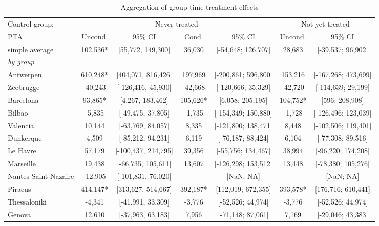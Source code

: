 \begin{table}[ht]
\centering
\caption{Aggregation of group time treatment effects} 
\begingroup\begin{adjustbox}{max width=\textwidth}
\begin{tabular}{lcccccc}
  \hline
\hline
Control group: & \multicolumn{4}{c}{Never treated} & \multicolumn{2}{c}{Not yet treated} \\
 \cmidrule(lr){2-5} \cmidrule(lr){6-7}  PTA & Uncond. & 95\% CI & Cond. & 95\% CI & Uncond. & 95\% CI  \\ 
  \hline
simple average & 102,536* & [55,772, 149,300] &   36,030 & [-54,648; 126,707] &   28,683 & [-39,537; 96,902] \\ 
   [1ex]\emph{by group} &  &  &  &  &  &  \\ 
   \hline
Antwerpen & 610,248* & [404,071, 816,426] &  197,969 & [-200,861; 596,800] &  153,216 & [-167,268; 473,699] \\ 
  Zeebrugge & -40,243 & [-126,416, 45,930] &  -42,668 & [-120,666; 35,329] &  -42,720 & [-114,639; 29,199] \\ 
  Barcelona &  93,865* & [4,267, 183,462] &  105,626* & [6,058; 205,195] &  104,752* & [596; 208,908] \\ 
  Bilbao &  -5,835 & [-49,475, 37,805] &   -1,735 & [-154,349; 150,880] &   -1,728 & [-126,496; 123,039] \\ 
  Valencia &  10,144 & [-63,769, 84,057] &    8,335 & [-121,800; 138,471] &    8,448 & [-102,506; 119,401] \\ 
  Dunkerque &   4,509 & [-85,212, 94,231] &    6,119 & [-76,187; 88,424] &    6,104 & [-77,308; 89,516] \\ 
  Le Havre &  57,179 & [-100,437, 214,795] &   39,356 & [-55,756; 134,467] &   38,994 & [-96,220; 174,208] \\ 
  Marseille &  19,438 & [-66,735, 105,611] &   13,607 & [-126,298; 153,512] &   13,448 & [-78,380; 105,276] \\ 
  Nantes Saint Nazaire & -12,905 & [-101,831, 76,020] &  & [NaN; NA] &  & [NaN; NA] \\ 
  Piraeus & 414,147* & [313,627, 514,667] &  392,187* & [112,019; 672,355] &  393,578* & [176,716; 610,441] \\ 
  Thessaloniki &  -4,341 & [-41,991, 33,309] &   -3,776 & [-52,526; 44,974] &   -3,776 & [-52,526; 44,974] \\ 
  Genova &  12,610 & [-37,963, 63,183] &    7,956 & [-71,148; 87,061] &    7,169 & [-29,046; 43,383] \\ 

\end{tabular}
\end{adjustbox}
\end{table}
